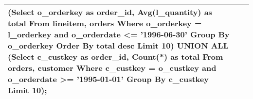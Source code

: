 {\begin{longtable}{|p{0.5cm}|p{7cm}|p{7cm}|}
(Select o\_orderkey as order\_id, Avg(l\_quantity) as total From lineitem, orders Where o\_orderkey = l\_orderkey and o\_orderdate  <= '1996-06-30' Group By o\_orderkey Order By total desc Limit 10)  UNION ALL  (Select c\_custkey as order\_id, Count(*) as total From orders, customer Where c\_custkey = o\_custkey and o\_orderdate  >= '1995-01-01' Group By c\_custkey Limit 10);\\\hline
\end{longtable}}